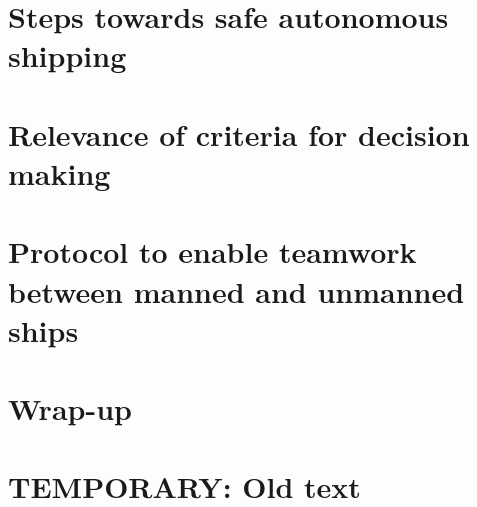 \documentclass[a4paper,11pt,oneside]{book}
\begin{document}
\frontmatter


\makeCover %

\listoftodos[Notes]
\clearpage





\clearpage
\setcounter{tocdepth}{1}
\tableofcontents
\clearpage

\mainmatter



\part{Steps towards safe autonomous shipping}







\part{Relevance of criteria for decision making}
\label{part:MT}








\part{Protocol to enable teamwork between manned and unmanned ships}
\label{part:CS}





\part{Wrap-up}



\backmatter

\part{TEMPORARY: Old text}





\end{document}
